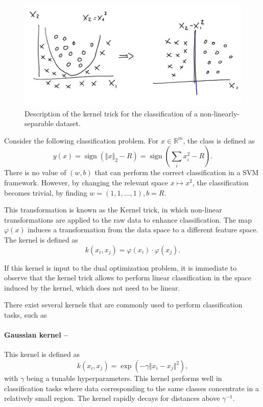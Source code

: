 \documentclass[]{report}
\newcommand{\sign}{\ensuremath{\operatorname{sign}}}
\begin{document}
\begin{figure}
\centering
\includegraphics[width = .8\linewidth]{images/kernel trick}
\caption{Description of the kernel trick for the classification of a non-linearly-separable dataset. }
\label{fig.kernel_trick}
\end{figure}

Consider the following classification problem. For $x \in \mathbb R^m$, the class is defined as
\begin{equation}
y(x) = \sign(\Vert x \Vert_2 - R) = \sign\left( \sum_{i} x_i^2 - R\right). 
\end{equation}
There is no value of $(w, b)$ that can perform the correct classification in a SVM framework. However, by changing the relevant space $x \mapsto x^2$, the classification becomes trivial, by finding $w = (1, 1, \ldots, 1), b = R$. 

This transformation is known as the Kernel trick, in which non-linear transformations are applied to the raw data to enhance classification. The map $\varphi(x)$ induces a transformation from the data space to a different feature space. The kernel is defined as
\begin{equation}
k(x_i, x_j) = \varphi(x_i) \cdot \varphi(x_j).
\end{equation}

If this kernel is input to the dual optimization problem, it is immediate to observe that the kernel trick allows to perform linear classification in the space induced by the kernel, which does not need to be linear. 

There exist several kernels that are commonly used to perform classification tasks, such as

\paragraph{Gaussian kernel --} This kernel is defined as
\begin{equation}
k(x_i, x_j) = \exp( - \gamma \Vert x_i - x_j\Vert^2), 
\end{equation}
with $\gamma$ being a tunable hyperparameters. This kernel performs well in classification tasks where data corresponding to the same classes concentrate in a relatively small region. The kernel rapidly decays for distances above $\gamma^{-1}$. 
\end{document}
